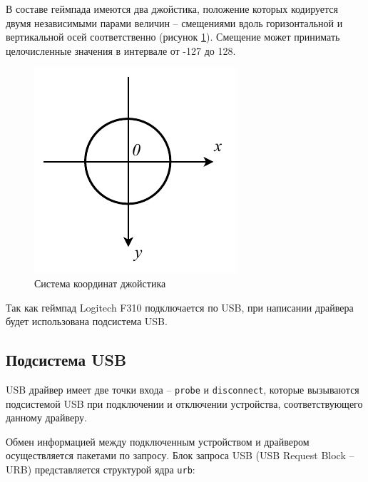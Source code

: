 В составе геймпада имеются два джойстика, положение которых кодируется двумя независимыми парами величин -- смещениями вдоль горизонтальной и вертикальной осей соответственно (рисунок \ref{fig:gamepad:axes}). Смещение может принимать целочисленные значения в интервале от -127 до 128.

\begin{figure}[ht]
    \centering
    \includegraphics[width=0.4\linewidth]{img/joystick_axes.pdf}
    \caption{Система координат джойстика}
    \label{fig:gamepad:axes}
\end{figure}

Так как геймпад Logitech F310 подключается по USB, при написании драйвера будет использована подсистема USB.

\subsection{Подсистема USB}





USB драйвер имеет две точки входа -- \texttt{probe} и \texttt{disconnect}, которые вызываются подсистемой USB при подключении и отключении устройства, соответствующего данному драйверу.

Обмен информацией между подключенным устройством и драйвером осуществляется пакетами по запросу. Блок запроса USB (USB Request Block -- URB) представляется структурой ядра \texttt{urb}:


